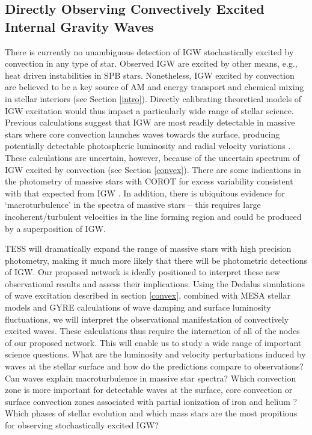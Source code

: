 \subsection{Directly Observing Convectively Excited Internal Gravity Waves}

There is currently no unambiguous detection of IGW stochastically excited by convection in any type of star. {\color{green} Observed IGW are excited by other means, e.g., heat driven instabilities in SPB stars.} Nonetheless, IGW excited by convection are believed to be a key source of AM and energy transport and chemical mixing in stellar interiors (see Section \ref{intro}).  Directly calibrating theoretical models of IGW excitation would thus impact a particularly wide range of stellar science. Previous calculations suggest that IGW are most readily detectable in massive stars where core convection launches waves towards the surface, producing potentially detectable photospheric luminosity and radial velocity variations \citep{samadi2010,shiode2013}. These calculations are uncertain, however, because of the uncertain spectrum of IGW excited by convection (see Section \ref{convex}).  There are some indications in the photometry of massive stars with COROT for excess variability consistent with that expected from IGW \citep{Aerts2015}.  In addition, there is ubiquitous evidence for `macroturbulence' in the spectra of massive stars -- this requires large incoherent/turbulent velocities in the line forming region and could be produced by a superposition of IGW.

TESS will dramatically expand the range of massive stars with high precision photometry, making it much more likely that there will be photometric detections of IGW. Our proposed network is ideally positioned to interpret these new observational results and assess their implications.  Using the Dedalus simulations of wave excitation described in section \ref{convex}, combined with MESA stellar models and GYRE calculations of wave damping and surface luminosity fluctuations, we will interpret the observational manifestation of convectively excited waves. {\color{green} These calculations thus require the interaction of all of the nodes of our proposed network.} This will enable us to study a wide range of important science questions. What are the luminosity and velocity perturbations induced by waves at the stellar surface and how do the predictions compare to observations?  Can waves explain macroturbulence in massive star spectra? Which convection zone is more important for detectable waves at the surface, core convection or surface convection zones associated with partial ionization of iron and helium \citep{Cantiello2009}? Which phases of stellar evolution and which mass stars are the most propitious for observing stochastically excited IGW? 
